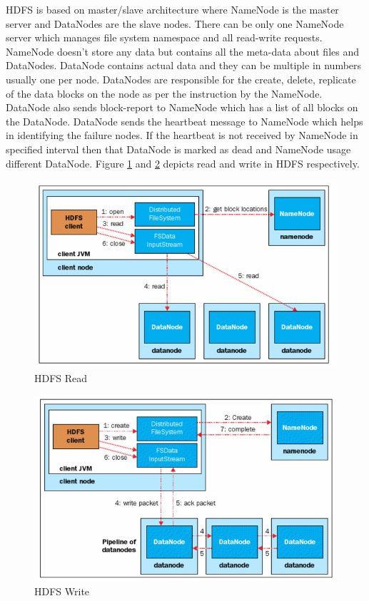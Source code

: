 \documentclass[sigconf]{acmart}
\begin{document}
HDFS is based on master/slave architecture where NameNode is the master server and DataNodes are the slave nodes. There can be only one NameNode server which manages file system namespace and all read-write requests. NameNode doesn't store any data but contains all the meta-data about files and DataNodes. DataNode contains actual data and they can be multiple in numbers usually one per node. DataNodes are responsible for the create, delete, replicate of the data blocks on the node as per the instruction by the NameNode. DataNode also sends block-report to NameNode which has a list of all blocks on the DataNode. DataNode sends the heartbeat message to NameNode which helps in identifying the failure nodes. If the heartbeat is not received by NameNode in specified interval then that DataNode is marked as dead and NameNode usage different DataNode. Figure \ref{f:hdfs-read} and \ref{f:hdfs-write} depicts read and write in HDFS respectively.

\begin{figure}[!ht]
  \centering\includegraphics[width=\columnwidth]{images/hdfsRead.PNG}
  \caption{HDFS Read \cite[Ch.\ 3, p. 38]{AchariShiva2015HE}}\label{f:hdfs-read}
\end{figure}

\begin{figure}[!ht]
  \centering\includegraphics[width=\columnwidth]{images/hdfsWrite.PNG}
  \caption{HDFS Write \cite[Ch.\ 3, p. 39]{AchariShiva2015HE}}\label{f:hdfs-write}
\end{figure}
\end{document}
